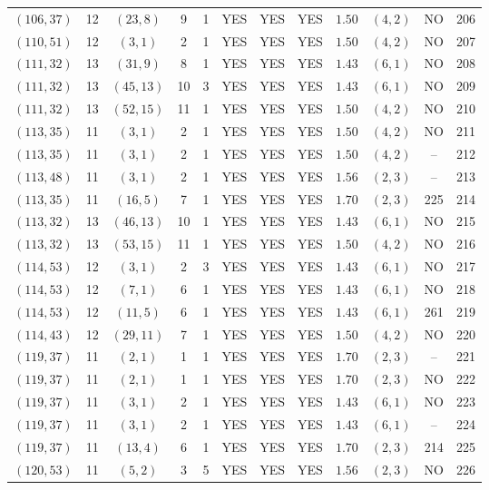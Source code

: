 \begin{longtable}{|c|c|c|c|c|c|c|c|c|c|c|c|}
$(106,37)$ & 12 & $(23,8)$ & 9 & 1 & YES & YES & YES & $1.50$ & $(4,2)$ & NO & 206\\
$(110,51)$ & 12 & $(3,1)$ & 2 & 1 & YES & YES & YES & $1.50$ & $(4,2)$ & NO & 207\\
$(111,32)$ & 13 & $(31,9)$ & 8 & 1 & YES & YES & YES & $1.43$ & $(6,1)$ & NO & 208\\
$(111,32)$ & 13 & $(45,13)$ & 10 & 3 & YES & YES & YES & $1.43$ & $(6,1)$ & NO & 209\\
$(111,32)$ & 13 & $(52,15)$ & 11 & 1 & YES & YES & YES & $1.50$ & $(4,2)$ & NO & 210\\
$(113,35)$ & 11 & $(3,1)$ & 2 & 1 & YES & YES & YES & $1.50$ & $(4,2)$ & NO & 211\\
$(113,35)$ & 11 & $(3,1)$ & 2 & 1 & YES & YES & YES & $1.50$ & $(4,2)$ & -- & 212\\
$(113,48)$ & 11 & $(3,1)$ & 2 & 1 & YES & YES & YES & $1.56$ & $(2,3)$ & -- & 213\\
$(113,35)$ & 11 & $(16,5)$ & 7 & 1 & YES & YES & YES & $1.70$ & $(2,3)$ & 225 & 214\\
$(113,32)$ & 13 & $(46,13)$ & 10 & 1 & YES & YES & YES & $1.43$ & $(6,1)$ & NO & 215\\
$(113,32)$ & 13 & $(53,15)$ & 11 & 1 & YES & YES & YES & $1.50$ & $(4,2)$ & NO & 216\\
$(114,53)$ & 12 & $(3,1)$ & 2 & 3 & YES & YES & YES & $1.43$ & $(6,1)$ & NO & 217\\
$(114,53)$ & 12 & $(7,1)$ & 6 & 1 & YES & YES & YES & $1.43$ & $(6,1)$ & NO & 218\\
$(114,53)$ & 12 & $(11,5)$ & 6 & 1 & YES & YES & YES & $1.43$ & $(6,1)$ & 261 & 219\\
$(114,43)$ & 12 & $(29,11)$ & 7 & 1 & YES & YES & YES & $1.50$ & $(4,2)$ & NO & 220\\
$(119,37)$ & 11 & $(2,1)$ & 1 & 1 & YES & YES & YES & $1.70$ & $(2,3)$ & -- & 221\\
$(119,37)$ & 11 & $(2,1)$ & 1 & 1 & YES & YES & YES & $1.70$ & $(2,3)$ & NO & 222\\
$(119,37)$ & 11 & $(3,1)$ & 2 & 1 & YES & YES & YES & $1.43$ & $(6,1)$ & NO & 223\\
$(119,37)$ & 11 & $(3,1)$ & 2 & 1 & YES & YES & YES & $1.43$ & $(6,1)$ & -- & 224\\
$(119,37)$ & 11 & $(13,4)$ & 6 & 1 & YES & YES & YES & $1.70$ & $(2,3)$ & 214 & 225\\
$(120,53)$ & 11 & $(5,2)$ & 3 & 5 & YES & YES & YES & $1.56$ & $(2,3)$ & NO & 226\\

\end{longtable}
